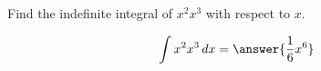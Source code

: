 \documentclass{ximera}
\author{Gregory Hartman \and Matthew Carr}
\begin{document}
\begin{exercise}


Find the indefinite integral of $x^{2}x^{3}$ with respect to $x$.

\[
\int x^{2}x^{3} \d x=\answer{\frac{1}{6}x^{6}}
\]


\end{exercise}
\end{document}
